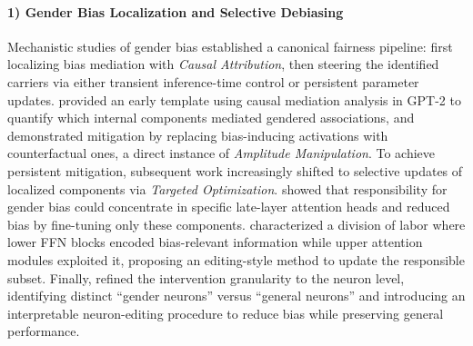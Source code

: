 \documentclass[11pt,letterpaper]{mystyle}
\begin{document}
  \paragraph{1) Gender Bias Localization and Selective Debiasing}
  Mechanistic studies of gender bias established a canonical fairness pipeline: first localizing bias mediation with \textit{Causal Attribution}, then steering the identified carriers via either transient inference-time control or persistent parameter updates.
  \citet{vig2020gender} provided an early template using causal mediation analysis in GPT-2 to quantify which internal components mediated gendered associations, and demonstrated mitigation by replacing bias-inducing activations with counterfactual ones, a direct instance of \textit{Amplitude Manipulation}.
  To achieve persistent mitigation, subsequent work increasingly shifted to selective updates of localized components via \textit{Targeted Optimization}. \citet{chintamIdentifyingAdaptingTransformerComponents2023} showed that responsibility for gender bias could concentrate in specific late-layer attention heads and reduced bias by fine-tuning only these components. \citet{caiLocatingMitigatingGender2024} characterized a division of labor where lower FFN blocks encoded bias-relevant information while upper attention modules exploited it, proposing an editing-style method to update the responsible subset. Finally, \citet{yuUnderstandingMitigatingGender2025a} refined the intervention granularity to the neuron level, identifying distinct “gender neurons” versus “general neurons” and introducing an interpretable neuron-editing procedure to reduce bias while preserving general performance.
  
\end{document}

